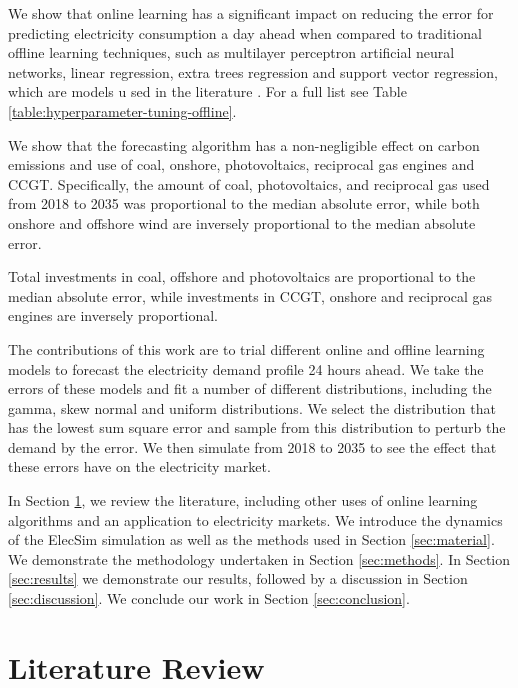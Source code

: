 \documentclass[final,3p,times,twocolumn,numbers]{elsarticle}
\begin{document}

We show that online learning has a significant impact on reducing the error for predicting electricity consumption a day ahead when compared to traditional offline learning techniques, such as multilayer perceptron artificial neural networks, linear regression, extra trees regression and support vector regression, which are models u sed in the literature \cite{Lu1993, Ahmad2017, Chen2004}. For a full list see Table \ref{table:hyperparameter-tuning-offline}.

We show that the forecasting algorithm has a non-negligible effect on carbon emissions and use of coal, onshore, photovoltaics, reciprocal gas engines and CCGT. Specifically, the amount of coal, photovoltaics, and reciprocal gas used from 2018 to 2035 was proportional to the median absolute error, while both onshore and offshore wind are inversely proportional to the median absolute error.

Total investments in coal, offshore and photovoltaics are proportional to the median absolute error, while investments in CCGT, onshore and reciprocal gas engines are inversely proportional.




The contributions of this work are to trial different online and offline learning models to forecast the electricity demand profile 24 hours ahead. We take the errors of these models and fit a number of different distributions, including the gamma, skew normal and uniform distributions. We select the distribution that has the lowest sum square error and sample from this distribution to perturb the demand by the error. We then simulate from 2018 to 2035 to see the effect that these errors have on the electricity market.



In Section \ref{sec:lit-review}, we review the literature, including other uses of online learning algorithms and an application to electricity markets. We introduce the dynamics of the ElecSim simulation as well as the methods used in Section \ref{sec:material}. We demonstrate the methodology undertaken in Section \ref{sec:methods}. In Section \ref{sec:results} we demonstrate our results, followed by a discussion in Section \ref{sec:discussion}. We conclude our work in Section \ref{sec:conclusion}.

\section{Literature Review}
\label{sec:lit-review}
\end{document}
